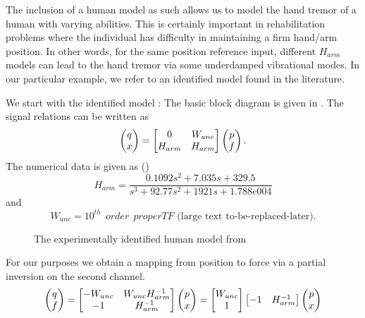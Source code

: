 The inclusion of a human model as such allows us to model the hand tremor of a human with varying abilities. This is certainly 
important in rehabilitation problems where the individual has difficulty in maintaining a firm hand/arm position. In other words, 
for the same position reference input, different $H_{arm}$ models can lead to the hand tremor via some underdamped vibrational 
modes. In our particular example, we refer to an identified model found in the literature. 


We start with the identified model \cite{fucavus} : The basic block diagram is given in . The signal relations can be written as
\[
\begin{pmatrix}q\\x\end{pmatrix} = \begin{bmatrix}0 &W_{unc}\\H_{arm} & H_{arm}\end{bmatrix}\begin{pmatrix}p\\f\end{pmatrix}.
\]
The numerical data is given as (\cite{fucavus})
\[
H_{arm} =     \frac{0.1092 s^2 + 7.035 s + 329.5}{s^3 + 92.77 s^2 + 1921 s + 1.788e004}
\]
and 
\[
W_{unc}= 10^{th} \ \ order \ \ proper TF\text{ (large text to-be-replaced-later)}.%
\]


\begin{figure}%
\centering
{}
\caption{The experimentally identified human model from \cite{fucavus}}%
\label{fig:identifiedmodel}%
\end{figure}

For our purposes we obtain a mapping from position to force via a partial inversion on the second channel. 
\[
\begin{pmatrix}q\\f\end{pmatrix} = \begin{bmatrix}-W_{unc} &W_{unc}H_{arm}^{-1}\\-1 &H_{arm}^{-1}\end{bmatrix}\begin{pmatrix}p\\x\end{pmatrix} = \begin{bmatrix}W_{unc}\\1\end{bmatrix}\begin{bmatrix}-1 &H_{arm}^{-1}\end{bmatrix}\begin{pmatrix}p\\x\end{pmatrix}
\]


